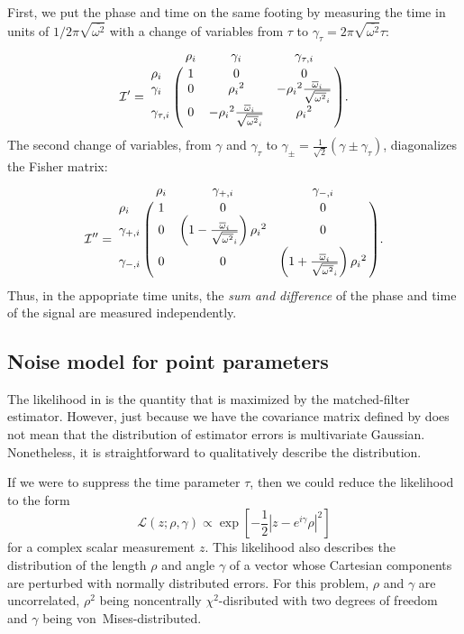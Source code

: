 \documentclass{iopart}
\let\oldmarginpar\marginpar
\renewcommand\marginpar[1]{\-\oldmarginpar[\raggedleft\footnotesize #1]%
{\raggedright\footnotesize #1}}
\begin{document}
First, we put the phase and time on the same footing by measuring the time in units of $1 / 2 \pi \sqrt{\overline{\omega^2}}$ with a change of variables from $\tau$ to $\gamma_\tau = 2 \pi \sqrt{\overline{\omega^2}} \tau$:
%
\begin{equation}
    \mathcal{I}' = \bordermatrix{
        ~ & \rho_i & \gamma_i & \gamma_{\tau,i} \cr
        \rho_i & 1 & 0 & 0 \cr
        \gamma_i & 0 & {\rho_i}^2 & -{\rho_i}^2\frac{{\overline{\omega}}_i}{\sqrt{{\overline{\omega^2}}_i}} \cr
        \gamma_{\tau,i} & 0 & -{\rho_i}^2\frac{{\overline{\omega}}_i}{\sqrt{{\overline{\omega^2}}_i}} & {\rho_i}^2
    }.
\end{equation}
%
The second change of variables, from $\gamma$ and $\gamma_\tau$ to $\gamma_\pm = \frac{1}{\sqrt{2}}(\gamma \pm \gamma_\tau)$, diagonalizes the Fisher matrix:
%
\begin{equation}
    \mathcal{I}'' = \bordermatrix{
        ~ & \rho_i & \gamma_{+,i} & \gamma_{-,i} \cr
        \rho_i & 1 & 0 & 0 \cr
        \gamma_{+,i} & 0 & \left(1 - \frac{\overline{\omega}_i}{\sqrt{\overline{\omega^2}_i}}\right){\rho_i}^2 & 0 \cr
        \gamma_{-,i} & 0 & 0 & \left(1 + \frac{\overline{\omega}_i}{\sqrt{\overline{\omega^2}_i}}\right){\rho_i}^2
    }.
\end{equation}
%
Thus, in the appopriate time units, the \textit{sum and difference} of the phase and time of the signal are measured independently.

\subsection{Noise model for point parameters}

The likelihood in  is the quantity that is maximized by the matched\nobreakdashes-filter estimator. However, just because we have the covariance matrix defined by  does not mean that the distribution of estimator errors is multivariate Gaussian. Nonetheless, it is straightforward to qualitatively describe the distribution.

If we were to suppress the time parameter $\tau$, then we could reduce the likelihood to the form
%
\begin{equation}
    \mathcal{L}(z; \rho, \gamma) \propto \exp \left[ -\frac{1}{2} \left|z - e^{i \gamma} \rho \right|^2 \right]
\end{equation}
%
for a complex scalar measurement $z$. This likelihood also describes the distribution of the length $\rho$ and angle $\gamma$ of a vector whose Cartesian components are perturbed with normally distributed errors. For this problem, $\rho$ and $\gamma$ are uncorrelated, $\rho^2$ being noncentrally $\chi^2$\nobreakdashes-disributed with two degrees of freedom and $\gamma$ being von~Mises\nobreakdashes-distributed.%
%
\marginpar{Picture here?}
\end{document}
